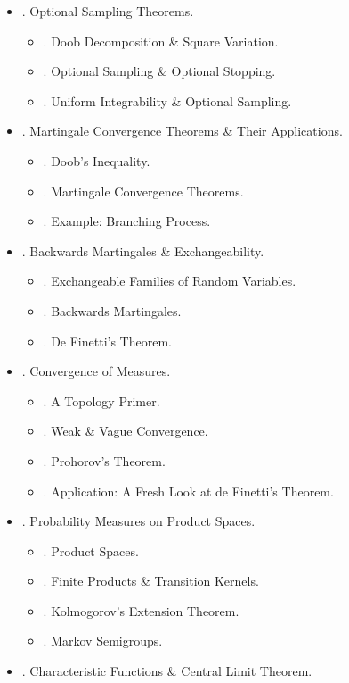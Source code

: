 \documentclass{article}
\begin{document}
\begin{enumerate}
\begin{itemize}
		\item {. Optional Sampling Theorems.}
		\begin{itemize}
			\item {. Doob Decomposition \& Square Variation.}
			\item {. Optional Sampling \& Optional Stopping.}
			\item {. Uniform Integrability \& Optional Sampling.}
		\end{itemize}
		\item {. Martingale Convergence Theorems \& Their Applications.}
		\begin{itemize}
			\item {. Doob's Inequality.}
			\item {. Martingale Convergence Theorems.}
			\item {. Example: Branching Process.}
		\end{itemize}
		\item {. Backwards Martingales \& Exchangeability.}
		\begin{itemize}
			\item {. Exchangeable Families of Random Variables.}
			\item {. Backwards Martingales.}
			\item {. De Finetti's Theorem.}
		\end{itemize}
		\item {. Convergence of Measures.}
		\begin{itemize}
			\item {. A Topology Primer.}
			\item {. Weak \& Vague Convergence.}
			\item {. Prohorov's Theorem.}
			\item {. Application: A Fresh Look at de Finetti's Theorem.}
		\end{itemize}
		\item {. Probability Measures on Product Spaces.}
		\begin{itemize}
			\item {. Product Spaces.}
			\item {. Finite Products \& Transition Kernels.}
			\item {. Kolmogorov's Extension Theorem.}
			\item {. Markov Semigroups.}
		\end{itemize}
		\item {. Characteristic Functions \& Central Limit Theorem.}

\end{itemize}
\end{enumerate}
\end{document}
